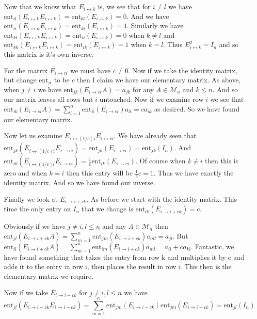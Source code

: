 \documentclass[letterpaper]{article}
\begin{document}
\begin{enumerate}
Now that we know what $E_{i\leftrightarrow k}$ is, we see that for
$i\ne l$ we have $\text{ent}_{il}(E_{i\leftrightarrow k}E_{i\leftrightarrow k})=\text{ent}_{kl}(E_{i\leftrightarrow k})=0$.
And we have $\text{ent}_{ii}(E_{i\leftrightarrow k}E_{i\leftrightarrow k})=\text{ent}_{ki}(E_{i\leftrightarrow k})=1$.
Similarly 
we have $\text{ent}_{kl}(E_{i\leftrightarrow k}E_{i\leftrightarrow k})=\text{ent}_{il}(E_{i\leftrightarrow k})=0$ when $k\ne l$ and
$\text{ent}_{kk}(E_{i\leftrightarrow k}E_{i\leftrightarrow k})=\text{ent}_{ik}(E_{i\leftrightarrow k})=1$ when $k=l$. Thus $E_{i\leftrightarrow k}^{2}=I_n$ and so this matrix is it's own inverse.

For the matrix $E_{i\to ci}$ we must have $c\ne 0$.
Now if we take the identity matrix, but change $\text{ent}_{ii}$ to be $c$ then I claim we have our elementary matrix.
As above, when $j\ne i$ we have $\text{ent}_{jk}(E_{i\to ci}A)=a_{jk}$ for any  $A\in \mathcal{M}_n$ and $k\le n$.
And so our matrix leaves all rows but $i$ untouched. Now if we examine row $i$ we see that $\text{ent}_{ik}(E_{i\to ci}A)=\sum\limits_{l=1}^n{\text{ent}_{il}(E_{i\to ci})a_{li}}=ca_{ik}$ as desired. So we have found our elementary matrix.

Now let us examine $E_{i\leftrightarrow (1/c)i}E_{i\leftrightarrow ci}$. We have already seen that $\text{ent}_{jk}(E_{i\leftrightarrow (1/c)i}E_{i\to ci})=\text{ent}_{jk}(E_{i\to ci})=\text{ent}_{jk}(I_n)$. And $\text{ent}_{ik}(E_{i\leftrightarrow (1/c)i}E_{i\to ci})=\frac{1}{c}\text{ent}_{ik}(E_{i\to ci})$. Of course when $k\ne i$ then this is zero and when $k=i$ then this entry will be $\frac{1}{c}c=1$. Thus we have exactly the identity matrix. And so we have found our inverse.

Finally we look at $E_{i\to i+ck}$. As before we start with the identity matrix. This time the only entry on $I_n$ that we change is $\text{ent}_{ik}(E_{i\to i+ck})=c$.

Obviously if we have $j\ne i, l\le n$ and any $A\in\mathcal{M}_n$ then $\text{ent}_{jl}(E_{i\to i+ck}A)=\sum\limits_{m=1}^n{\text{ent}_{jm}(E_{i\to i+ck})a_{ml}}=a_{jl}$.
But $\text{ent}_{il}(E_{i\to i+ck}A)=\sum\limits_{m=1}^n{\text{ent}_{im}(E_{i\to i+ck})a_{ml}}=a_{il}+ca_{kl}$. Fantastic, we have found something that takes the entry from row k and multiplies it by c and adds it to the entry in row i, then places the result in row i. This then is the elementary matrix we require.

Now if we take $E_{i\to i-ck}$ for 
$j\ne i, l\le n$ we have $$\text{ent}_{jl}(E_{i\to i-ck}E_{i\to i+ck})=\sum\limits_{m=1}^n{\text{ent}_{jm}(E_{i\to i-ck})\text{ent}_{jm}(E_{i\to i+ck})}=\text{ent}_{jl}(I_n)$$


\end{enumerate}
\end{document}
